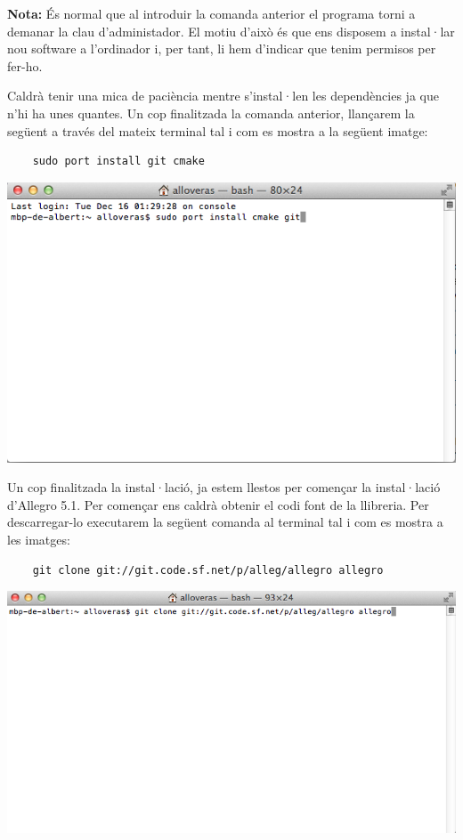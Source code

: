 \documentclass[11pt]{article}
\begin{document}
\noindent \textbf{Nota:} És normal que al introduir la comanda anterior el programa torni a demanar la clau d'administador. El motiu d'això és que ens disposem a instal·lar nou software a l'ordinador i, per tant, li hem d'indicar que tenim permisos per fer-ho.

\newpage
\noindent Caldrà tenir una mica de paciència mentre s'instal·len les dependències ja que n'hi ha unes quantes. Un cop finalitzada la comanda anterior, llançarem la següent a través del mateix terminal tal i com es mostra a la següent imatge:

\begin{verbatim}
	sudo port install git cmake
\end{verbatim}

\begin{center}
	\includegraphics[scale=0.5]{img/Ports_Install_Git_Cmake.png}
\end{center}

\noindent Un cop finalitzada la instal·lació, ja estem llestos per començar la instal·lació d'Allegro 5.1. Per començar ens caldrà obtenir el codi font de la llibreria. Per descarregar-lo executarem la següent comanda al terminal tal i com es mostra a les imatges:

\begin{verbatim}
	git clone git://git.code.sf.net/p/alleg/allegro allegro
\end{verbatim}

\begin{center}
	\includegraphics[scale=0.5]{img/Git_Clone.png}
\end{center}
\end{document}
